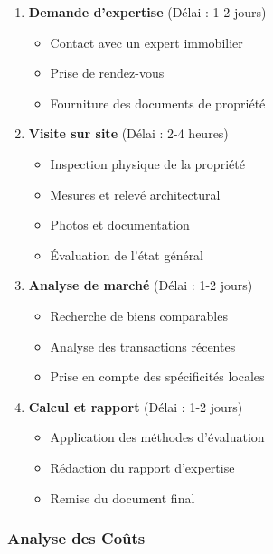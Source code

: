 \begin{enumerate}
    \item \textbf{Demande d'expertise} (Délai : 1-2 jours)
    \begin{itemize}
        \item Contact avec un expert immobilier
        \item Prise de rendez-vous
        \item Fourniture des documents de propriété
    \end{itemize}
    
    \item \textbf{Visite sur site} (Délai : 2-4 heures)
    \begin{itemize}
        \item Inspection physique de la propriété
        \item Mesures et relevé architectural
        \item Photos et documentation
        \item Évaluation de l'état général
    \end{itemize}
    
    \item \textbf{Analyse de marché} (Délai : 1-2 jours)
    \begin{itemize}
        \item Recherche de biens comparables
        \item Analyse des transactions récentes
        \item Prise en compte des spécificités locales
    \end{itemize}
    
    \item \textbf{Calcul et rapport} (Délai : 1-2 jours)
    \begin{itemize}
        \item Application des méthodes d'évaluation
        \item Rédaction du rapport d'expertise
        \item Remise du document final
    \end{itemize}
\end{enumerate}

\subsubsection{Analyse des Coûts}

